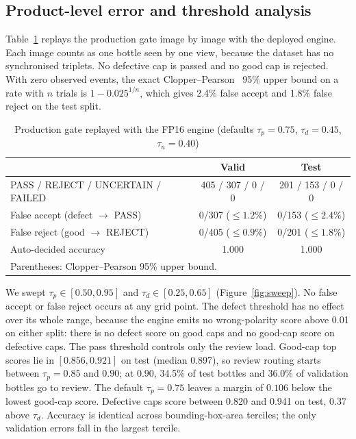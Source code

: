 \subsection{Product-level error and threshold analysis}
\label{sec:res-gate}
Table~\ref{tab:gate} replays the production gate image by image with the deployed engine. Each image counts as one bottle seen by one view, because the dataset has no synchronised triplets. No defective cap is passed and no good cap is rejected. With zero observed events, the exact Clopper--Pearson~\cite{clopper1934} 95\% upper bound on a rate with $n$ trials is $1-0.025^{1/n}$, which gives 2.4\% false accept and 1.8\% false reject on the test split.

\begin{table}[htbp]
\centering
\caption{Production gate replayed with the FP16 engine (defaults $\tau_p=0.75$, $\tau_d=0.45$, $\tau_u=0.40$)}
\label{tab:gate}
\footnotesize
\begin{tabular}{|l|c|c|}
\hline
 & \textbf{Valid} & \textbf{Test} \\ \hline
PASS / REJECT / UNCERTAIN / FAILED & 405 / 307 / 0 / 0 & 201 / 153 / 0 / 0 \\ \hline
False accept (defect $\rightarrow$ PASS) & 0/307 ($\leq1.2\%$) & 0/153 ($\leq2.4\%$) \\ \hline
False reject (good $\rightarrow$ REJECT) & 0/405 ($\leq0.9\%$) & 0/201 ($\leq1.8\%$) \\ \hline
Auto-decided accuracy & 1.000 & 1.000 \\ \hline
\multicolumn{3}{l}{\scriptsize Parentheses: Clopper--Pearson 95\% upper bound.}
\end{tabular}
\end{table}

We swept $\tau_p\in[0.50,0.95]$ and $\tau_d\in[0.25,0.65]$ (Figure~\ref{fig:sweep}). No false accept or false reject occurs at any grid point. The defect threshold has no effect over its whole range, because the engine emits no wrong-polarity score above 0.01 on either split: there is no defect score on good caps and no good-cap score on defective caps. The pass threshold controls only the review load. Good-cap top scores lie in $[0.856, 0.921]$ on test (median 0.897), so review routing starts between $\tau_p=0.85$ and $0.90$; at $0.90$, 34.5\% of test bottles and 36.0\% of validation bottles go to review. The default $\tau_p=0.75$ leaves a margin of $0.106$ below the lowest good-cap score. Defective caps score between 0.820 and 0.941 on test, 0.37 above $\tau_d$. Accuracy is identical across bounding-box-area terciles; the only validation errors fall in the largest tercile.

